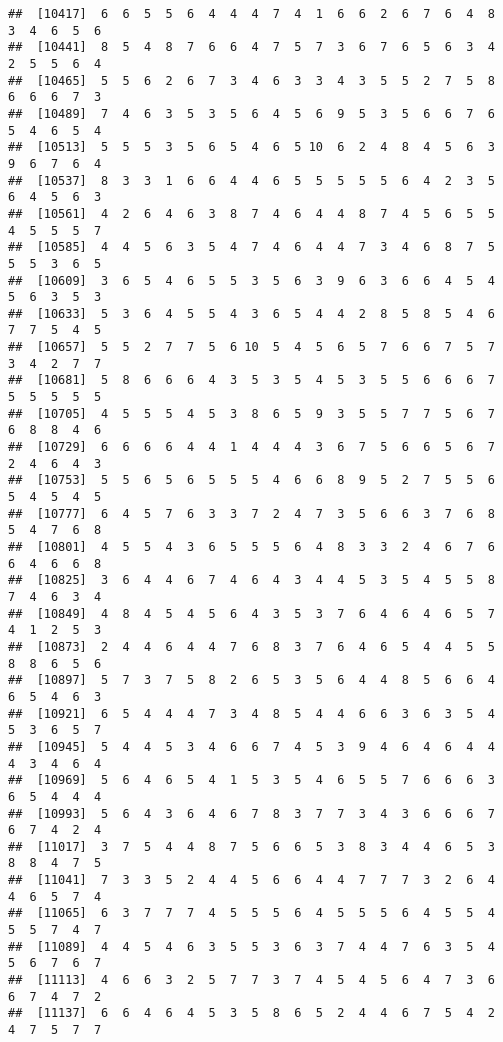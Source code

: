 \documentclass[
]{book}
\begin{document}
\begin{verbatim}
##  [10417]  6  6  5  5  6  4  4  4  7  4  1  6  6  2  6  7  6  4  8  3  4  6  5  6
##  [10441]  8  5  4  8  7  6  6  4  7  5  7  3  6  7  6  5  6  3  4  2  5  5  6  4
##  [10465]  5  5  6  2  6  7  3  4  6  3  3  4  3  5  5  2  7  5  8  6  6  6  7  3
##  [10489]  7  4  6  3  5  3  5  6  4  5  6  9  5  3  5  6  6  7  6  5  4  6  5  4
##  [10513]  5  5  5  3  5  6  5  4  6  5 10  6  2  4  8  4  5  6  3  9  6  7  6  4
##  [10537]  8  3  3  1  6  6  4  4  6  5  5  5  5  5  6  4  2  3  5  6  4  5  6  3
##  [10561]  4  2  6  4  6  3  8  7  4  6  4  4  8  7  4  5  6  5  5  4  5  5  5  7
##  [10585]  4  4  5  6  3  5  4  7  4  6  4  4  7  3  4  6  8  7  5  5  5  3  6  5
##  [10609]  3  6  5  4  6  5  5  3  5  6  3  9  6  3  6  6  4  5  4  5  6  3  5  3
##  [10633]  5  3  6  4  5  5  4  3  6  5  4  4  2  8  5  8  5  4  6  7  7  5  4  5
##  [10657]  5  5  2  7  7  5  6 10  5  4  5  6  5  7  6  6  7  5  7  3  4  2  7  7
##  [10681]  5  8  6  6  6  4  3  5  3  5  4  5  3  5  5  6  6  6  7  5  5  5  5  5
##  [10705]  4  5  5  5  4  5  3  8  6  5  9  3  5  5  7  7  5  6  7  6  8  8  4  6
##  [10729]  6  6  6  6  4  4  1  4  4  4  3  6  7  5  6  6  5  6  7  2  4  6  4  3
##  [10753]  5  5  6  5  6  5  5  5  4  6  6  8  9  5  2  7  5  5  6  5  4  5  4  5
##  [10777]  6  4  5  7  6  3  3  7  2  4  7  3  5  6  6  3  7  6  8  5  4  7  6  8
##  [10801]  4  5  5  4  3  6  5  5  5  6  4  8  3  3  2  4  6  7  6  6  4  6  6  8
##  [10825]  3  6  4  4  6  7  4  6  4  3  4  4  5  3  5  4  5  5  8  7  4  6  3  4
##  [10849]  4  8  4  5  4  5  6  4  3  5  3  7  6  4  6  4  6  5  7  4  1  2  5  3
##  [10873]  2  4  4  6  4  4  7  6  8  3  7  6  4  6  5  4  4  5  5  8  8  6  5  6
##  [10897]  5  7  3  7  5  8  2  6  5  3  5  6  4  4  8  5  6  6  4  6  5  4  6  3
##  [10921]  6  5  4  4  4  7  3  4  8  5  4  4  6  6  3  6  3  5  4  5  3  6  5  7
##  [10945]  5  4  4  5  3  4  6  6  7  4  5  3  9  4  6  4  6  4  4  4  3  4  6  4
##  [10969]  5  6  4  6  5  4  1  5  3  5  4  6  5  5  7  6  6  6  3  6  5  4  4  4
##  [10993]  5  6  4  3  6  4  6  7  8  3  7  7  3  4  3  6  6  6  7  6  7  4  2  4
##  [11017]  3  7  5  4  4  8  7  5  6  6  5  3  8  3  4  4  6  5  3  8  8  4  7  5
##  [11041]  7  3  3  5  2  4  4  5  6  6  4  4  7  7  7  3  2  6  4  4  6  5  7  4
##  [11065]  6  3  7  7  7  4  5  5  5  6  4  5  5  5  6  4  5  5  4  5  5  7  4  7
##  [11089]  4  4  5  4  6  3  5  5  3  6  3  7  4  4  7  6  3  5  4  5  6  7  6  7
##  [11113]  4  6  6  3  2  5  7  7  3  7  4  5  4  5  6  4  7  3  6  6  7  4  7  2
##  [11137]  6  6  4  6  4  5  3  5  8  6  5  2  4  4  6  7  5  4  2  4  7  5  7  7

\end{verbatim}
\end{document}
